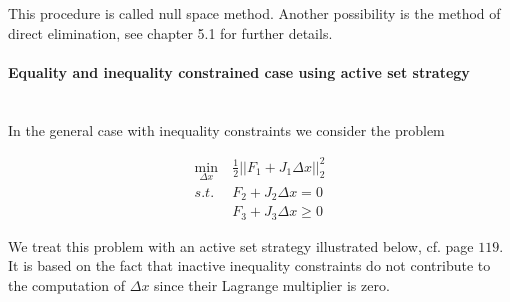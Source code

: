 \documentclass{scrartcl}[12pt, halfparskip]
\numberwithin{equation}{section}
\numberwithin{figure}{section}
\numberwithin{table}{section}
\begin{document}
This procedure is called null space method. Another possibility is the method of direct elimination, see \cite{numerical_methods_lsq_Bjorck} chapter 5.1 for further details.


\paragraph{Equality and inequality constrained case using active set strategy} \label{par:theory_active_set_strategy} \mbox{}\\
In the general case with inequality constraints we consider the problem

\begin{align}
\min_{\Delta x} & \ \frac{1}{2} || F_1 + J_1 \Delta x ||_2^2 \label{eq:numerical_soln_ineq_constrained_LSQ} \\
s.t. & \ F_2 + J_2 \Delta x = 0 \nonumber \\
&  \ F_3 + J_3 \Delta x \ge 0 \nonumber
\end{align}

We treat this problem with an active set strategy illustrated below, cf. \cite{diss_bock} page $119$. It is based on the fact that inactive inequality constraints do not contribute to the computation of $\Delta x$ since their Lagrange multiplier is zero.
\end{document}
